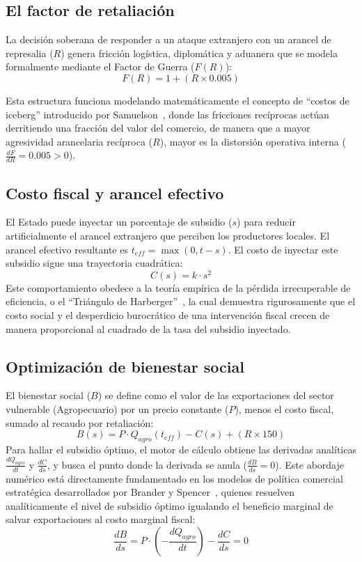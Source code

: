 \documentclass[12pt, a4paper]{article}
\begin{document}
\subsection{El factor de retaliación}
La decisión soberana de responder a un ataque extranjero con un arancel de represalia ($R$) genera fricción logística, diplomática y aduanera que se modela formalmente mediante el Factor de Guerra ($F(R)$):
\begin{equation}
    F(R) = 1 + (R \times 0.005)
\end{equation}

Esta estructura funciona modelando matemáticamente el concepto de ``costos de iceberg'' introducido por Samuelson~\cite[p.~268]{samuelson1954}, donde las fricciones recíprocas actúan derritiendo una fracción del valor del comercio, de manera que a mayor agresividad arancelaria recíproca ($R$), mayor es la distorsión operativa interna ($\frac{dF}{dR} = 0.005 > 0$).

\subsection{Costo fiscal y arancel efectivo}
El Estado puede inyectar un porcentaje de subsidio ($s$) para reducir artificialmente el arancel extranjero que perciben los productores locales. El arancel efectivo resultante es $t_{eff} = \max(0, t - s)$. El costo de inyectar este subsidio sigue una trayectoria cuadrática:
\begin{equation}
    C(s) = k \cdot s^2
\end{equation}
Este comportamiento obedece a la teoría empírica de la pérdida irrecuperable de eficiencia, o el ``Triángulo de Harberger''~\cite[p.~59]{harberger1964}, la cual demuestra rigurosamente que el costo social y el desperdicio burocrático de una intervención fiscal crecen de manera proporcional al cuadrado de la tasa del subsidio inyectado.

\subsection{Optimización de bienestar social}
El bienestar social ($B$) se define como el valor de las exportaciones del sector vulnerable (Agropecuario) por un precio constante ($P$), menos el costo fiscal, sumado al recaudo por retaliación:
\begin{equation}
    B(s) = P \cdot Q_{agro}(t_{eff}) - C(s) + (R \times 150)
\end{equation}
Para hallar el subsidio óptimo, el motor de cálculo obtiene las derivadas analíticas $\frac{dQ_{agro}}{dt}$ y $\frac{dC}{ds}$, y busca el punto donde la derivada se anula ($\frac{dB}{ds} = 0$). Este abordaje numérico está directamente fundamentado en los modelos de política comercial estratégica desarrollados por Brander y Spencer~\cite[p.~88]{brander1985}, quienes resuelven analíticamente el nivel de subsidio óptimo igualando el beneficio marginal de salvar exportaciones al costo marginal fiscal:
\begin{equation}
    \frac{dB}{ds} = P \cdot \left( -\frac{dQ_{agro}}{dt} \right) - \frac{dC}{ds} = 0
\end{equation}
\end{document}
